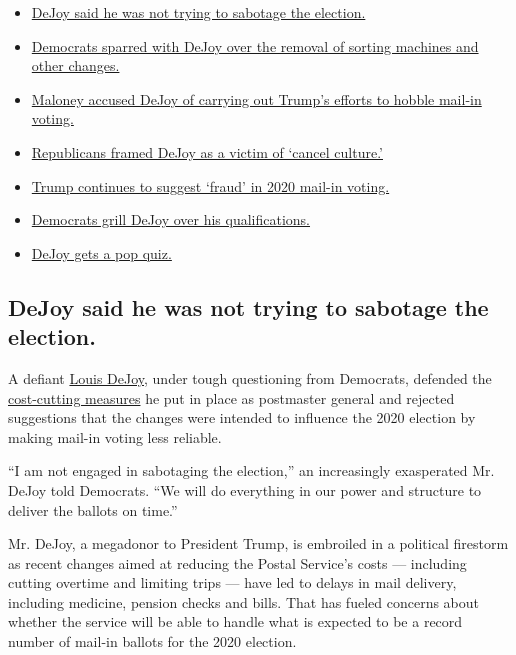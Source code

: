\begin{itemize}
\tightlist
\item
  \protect\hyperlink{link-25c465bd}{DeJoy said he was not trying to
  sabotage the election.}
\item
  \protect\hyperlink{link-674e5e34}{Democrats sparred with DeJoy over
  the removal of sorting machines and other changes.}
\item
  \protect\hyperlink{link-1b3ec52f}{Maloney accused DeJoy of carrying
  out Trump's efforts to hobble mail-in voting.}
\item
  \protect\hyperlink{link-3c1f694a}{Republicans framed DeJoy as a victim
  of `cancel culture.'}
\item
  \protect\hyperlink{link-582bf645}{Trump continues to suggest `fraud'
  in 2020 mail-in voting.}
\item
  \protect\hyperlink{link-36448afd}{Democrats grill DeJoy over his
  qualifications.}
\item
  \protect\hyperlink{link-460d7a51}{DeJoy gets a pop quiz.}
\end{itemize}

\hypertarget{dejoy-said-he-was-not-trying-to-sabotage-the-election}{%
\subsection{DeJoy said he was not trying to sabotage the
election.}\label{dejoy-said-he-was-not-trying-to-sabotage-the-election}}

A defiant
\href{https://www.nytimes3xbfgragh.onion/2020/08/24/us/politics/louis-dejoy-post-office-hearing.html}{Louis
DeJoy}, under tough questioning from Democrats, defended the
\href{https://www.nytimes3xbfgragh.onion/2020/08/15/us/post-office-vote-by-mail.html}{cost-cutting
measures} he put in place as postmaster general and rejected suggestions
that the changes were intended to influence the 2020 election by making
mail-in voting less reliable.

``I am not engaged in sabotaging the election,'' an increasingly
exasperated Mr. DeJoy told Democrats. ``We will do everything in our
power and structure to deliver the ballots on time.''

Mr. DeJoy, a megadonor to President Trump, is embroiled in a political
firestorm as recent changes aimed at reducing the Postal Service's costs
--- including cutting overtime and limiting trips --- have led to delays
in mail delivery, including medicine, pension checks and bills. That has
fueled concerns about whether the service will be able to handle what is
expected to be a record number of mail-in ballots for the 2020 election.

